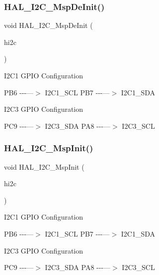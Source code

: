 \subsubsection{\texorpdfstring{HAL\_I2C\_MspDeInit()}{HAL\_I2C\_MspDeInit()}}
{\footnotesize\ttfamily void H\+A\+L\+\_\+\+I2\+C\+\_\+\+Msp\+De\+Init (\begin{DoxyParamCaption}\item[{\mbox{\hyperlink{struct_____i2_c___handle_type_def}{I2\+C\+\_\+\+Handle\+Type\+Def}} $\ast$}]{hi2c }\end{DoxyParamCaption})}

I2\+C1 G\+P\+IO Configuration

P\+B6 -\/-\/-\/---$>$ I2\+C1\+\_\+\+S\+CL P\+B7 -\/-\/-\/---$>$ I2\+C1\+\_\+\+S\+DA

I2\+C3 G\+P\+IO Configuration

P\+C9 -\/-\/-\/---$>$ I2\+C3\+\_\+\+S\+DA P\+A8 -\/-\/-\/---$>$ I2\+C3\+\_\+\+S\+CL\mbox{\label{group___i2_c___exported___functions___group1_gabe01a202c27b23fc150aa66af3130073}} 
\subsubsection{\texorpdfstring{HAL\_I2C\_MspInit()}{HAL\_I2C\_MspInit()}}
{\footnotesize\ttfamily void H\+A\+L\+\_\+\+I2\+C\+\_\+\+Msp\+Init (\begin{DoxyParamCaption}\item[{\mbox{\hyperlink{struct_____i2_c___handle_type_def}{I2\+C\+\_\+\+Handle\+Type\+Def}} $\ast$}]{hi2c }\end{DoxyParamCaption})}

I2\+C1 G\+P\+IO Configuration

P\+B6 -\/-\/-\/---$>$ I2\+C1\+\_\+\+S\+CL P\+B7 -\/-\/-\/---$>$ I2\+C1\+\_\+\+S\+DA

I2\+C3 G\+P\+IO Configuration

P\+C9 -\/-\/-\/---$>$ I2\+C3\+\_\+\+S\+DA P\+A8 -\/-\/-\/---$>$ I2\+C3\+\_\+\+S\+CL